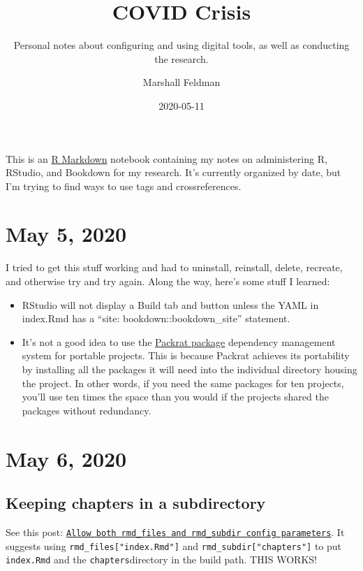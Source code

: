 \documentclass[
  12pt,
]{book}
\title{COVID Crisis}
\subtitle{Personal notes about configuring and using digital tools, as well as conducting the research.}
\author{Marshall Feldman}
\date{2020-05-11}
\providecommand{\tightlist}{%
  \setlength{\itemsep}{0pt}\setlength{\parskip}{0pt}}
\begin{document}
\maketitle

{
\setcounter{tocdepth}{2}
\tableofcontents
}
\listoftables
\listoffigures
This is an \href{http://rmarkdown.rstudio.com}{R Markdown} notebook containing my notes on administering R, RStudio, and Bookdown for my research. It's currently organized by date, but I'm trying to find ways to use tags and crossreferences.

\hypertarget{may-5-2020}{%
\chapter{May 5, 2020}\label{may-5-2020}}

I tried to get this stuff working and had to uninstall, reinstall, delete, recreate, and otherwise try and try again. Along the way, here's some stuff I learned:

\begin{itemize}
\tightlist
\item
  RStudio will not display a Build tab and button unless the YAML in index.Rmd has a ``site: bookdown::bookdown\_site'' statement.
\item
  It's not a good idea to use the \href{https://rstudio.github.io/packrat/}{Packrat package} dependency management system for portable projects. This is because Packrat achieves its portability by installing all the packages it will need into the individual directory housing the project. In other words, if you need the same packages for ten projects, you'll use ten times the space than you would if the projects shared the packages without redundancy.
\end{itemize}

\hypertarget{may-6-2020}{%
\chapter{May 6, 2020}\label{may-6-2020}}

\hypertarget{keeping-chapters-in-a-subdirectory}{%
\section{Keeping chapters in a subdirectory}\label{keeping-chapters-in-a-subdirectory}}

See this post:
\href{https://github.com/rstudio/bookdown/pull/601}{\texttt{Allow\ both\ \textasciigrave{}rmd\_files\textasciigrave{}\ and\ \textasciigrave{}rmd\_subdir\textasciigrave{}\ config\ parameters}}.
It suggests using \texttt{rmd\_files{[}"index.Rmd"{]}} and \texttt{rmd\_subdir{[}"chapters"{]}} to put \texttt{index.Rmd} and the \texttt{chapters}directory in the build path. THIS WORKS!
\end{document}
